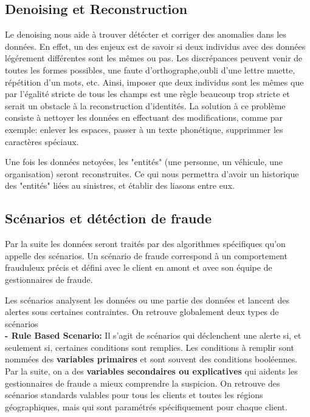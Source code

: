 \documentclass [twoside,openright,a4paper,11pt,french] {report}
\begin{document}
\subsection{Denoising et Reconstruction}

Le denoising nous aide à trouver détécter et corriger des anomalies dans les données. En effet, 
un des enjeux est de savoir si deux individus avec des données légérement différentes
sont les mêmes ou pas. Les discrépances peuvent venir de toutes les formes possibles,
une faute d'orthographe,oubli d'une lettre muette, répétition d'un mots, etc. Ainsi, 
imposer que deux individus sont les mêmes que par l'égalité stricte de tous les champs
est une règle beaucoup trop stricte et serait un obstacle à la reconstruction d'identités.
La solution à ce problème consiste à nettoyer les données en effectuant des modifications, comme 
par exemple: enlever les espaces, passer à un texte phonétique, supprimmer les 
caractères spéciaux.

Une fois les données netoyées, les "entités" (une personne, un véhicule, une organisation) seront reconstruites.
Ce qui nous permettra d'avoir un historique des "entités" liées au sinistres, et établir des liasons entre eux.

\subsection{Scénarios et détéction de fraude}

Par la suite les données seront traités par des algorithmes spécifiques qu'on appelle 
des scénarios. Un scénario de fraude correspond à un comportement frauduleux précis et défini
avec le client en amont et avec son équipe de gestionnaires de fraude.

Les scénarios analysent les données ou une partie des données et lancent des alertes 
sous certaines contraintes.  On retrouve globalement deux types de scénarios\\

\textbf{- Rule Based Scenario: } Il s'agit de scénarios qui déclenchent une alerte si, et seulement si, certaines conditions sont remplies.  
Les conditions à remplir sont nommées des \textbf{variables primaires} et sont souvent des conditions booléennes. 
Par la suite, on a des \textbf{variables secondaires ou explicatives} qui aidents les gestionnaires de fraude 
a mieux comprendre la suspicion.   
On retrouve des scénarios standards valables pour tous les clients et toutes les régions géographiques, mais qui sont paramétrés spécifiquement pour chaque client.
\end{document}
